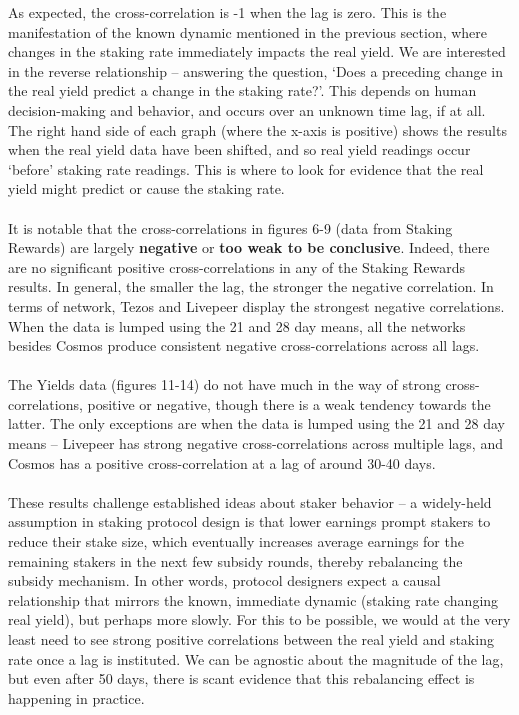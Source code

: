 \documentclass[longbibliography,nofootinbib]{revtex4-1}
\begin{document}
As expected, the cross-correlation is -1 when the lag is zero. This is the manifestation of the known dynamic mentioned in the previous section, where changes in the staking rate immediately impacts the real yield. We are interested in the reverse relationship – answering the question, `Does a preceding change in the real yield predict a change in the staking rate?'. This depends on human decision-making and behavior, and occurs over an unknown time lag, if at all. The right hand side of each graph (where the x-axis is positive) shows the results when the real yield data have been shifted, and so real yield readings occur `before' staking rate readings. This is where to look for evidence that the real yield might predict or cause the staking rate.
\\\\
It is notable that the cross-correlations in figures 6-9 (data from Staking Rewards) are largely \textbf{negative} or \textbf{too weak to be conclusive}. Indeed, there are no significant positive cross-correlations in any of the Staking Rewards results. In general, the smaller the lag, the stronger the negative correlation. In terms of network, Tezos and Livepeer display the strongest negative correlations. When the data is lumped using the 21 and 28 day means, all the networks besides Cosmos produce consistent negative cross-correlations across all lags.
\\\\
The Yields data (figures 11-14) do not have much in the way of strong cross-correlations, positive or negative, though there is a weak tendency towards the latter. The only exceptions are when the data is lumped using the 21 and 28 day means – Livepeer has strong negative cross-correlations across multiple lags, and Cosmos has a positive cross-correlation at a lag of around 30-40 days. 
\\\\
These results challenge established ideas about staker behavior – a widely-held assumption in staking protocol design is that lower earnings prompt stakers to reduce their stake size, which eventually increases average earnings for the remaining stakers in the next few subsidy rounds, thereby rebalancing the subsidy mechanism. In other words, protocol designers expect a causal relationship that mirrors the known, immediate dynamic (staking rate changing real yield), but perhaps more slowly. For this to be possible, we would at the very least need to see strong positive correlations between the real yield and staking rate once a lag is instituted. We can be agnostic about the magnitude of the lag, but even after 50 days, there is scant evidence that this rebalancing effect is happening in practice.
\end{document}
